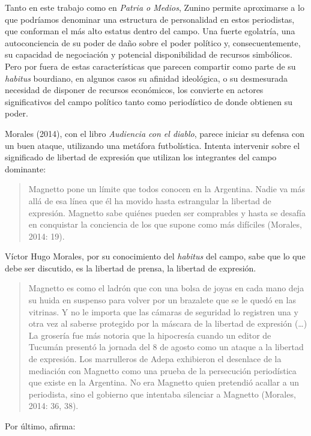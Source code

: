 Tanto en este trabajo como en \emph{Patria o Medios}, Zunino permite aproximarse a lo que podríamos denominar una estructura de personalidad en estos periodistas, que conforman el más alto estatus dentro del campo. Una fuerte egolatría, una autoconciencia de su poder de daño sobre el poder político y, consecuentemente, su capacidad de negociación y potencial disponibilidad de recursos simbólicos. Pero por fuera de estas características que parecen compartir como parte de su \emph{habitus} bourdiano, en algunos casos su afinidad ideológica, o su desmesurada necesidad de disponer de recursos económicos, los convierte en actores significativos del campo político tanto como periodístico de donde obtienen su poder.

Morales (2014), con el libro \emph{Audiencia con el diablo}, parece iniciar su defensa con un buen ataque, utilizando una metáfora futbolística. Intenta intervenir sobre el significado de libertad de expresión que utilizan los integrantes del campo dominante:

\begin{quote}
Magnetto pone un límite que todos conocen en la Argentina. Nadie va más allá de esa línea que él ha movido hasta estrangular la libertad de expresión. Magnetto sabe quiénes pueden ser comprables y hasta se desafía en conquistar la conciencia de los que supone como más difíciles (Morales, 2014: 19).
\end{quote}

Víctor Hugo Morales, por su conocimiento del \emph{habitus} del campo, sabe que lo que debe ser discutido, es la libertad de prensa, la libertad de expresión.

\begin{quote}
Magnetto es como el ladrón que con una bolsa de joyas en cada mano deja su huida en suspenso para volver por un brazalete que se le quedó en las vitrinas. Y no le importa que las cámaras de seguridad lo registren una y otra vez al saberse protegido por la máscara de la libertad de expresión (\ldots) La grosería fue más notoria que la hipocresía cuando un editor de Tucumán presentó la jornada del 8 de agosto como un ataque a la libertad de expresión. Los marrulleros de Adepa exhibieron el desenlace de la mediación con Magnetto como una prueba de la persecución periodística que existe en la Argentina. No era Magnetto quien pretendió acallar a un periodista, sino el gobierno que intentaba silenciar a Magnetto (Morales, 2014: 36, 38).
\end{quote}

Por último, afirma:

